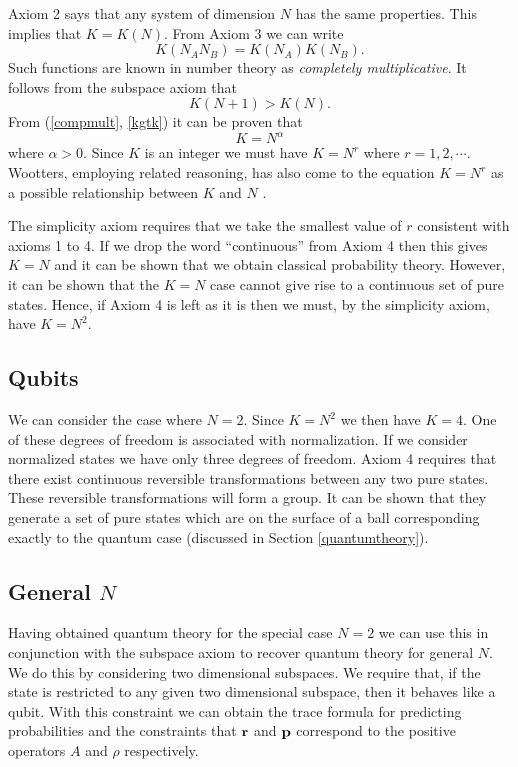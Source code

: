 \documentclass[12pt]{article}
\begin{document}
Axiom 2 says that
any system of dimension $N$ has the same properties. This implies that
$K=K(N)$.  From Axiom 3 we can write
\begin{equation}\label{compmult}
K(N_AN_B)=K(N_A)K(N_B).
\end{equation}
Such functions are known in number theory as {\it completely
multiplicative}.  It follows from the subspace axiom that
\begin{equation}\label{kgtk}
K(N+1)>K(N).
\end{equation}
From (\ref{compmult}, \ref{kgtk}) it can be proven that
\begin{equation}
K=N^{\alpha}
\end{equation}
where $\alpha>0$.  Since $K$ is an integer we must have $K=N^r$ where
$r=1,2,\cdots$. Wootters, employing related reasoning, has also
come to the equation $K=N^r$ as a possible relationship between $K$ and
$N$ \cite{wootters}.

The simplicity axiom requires that we take the smallest value of $r$
consistent with axioms 1 to 4.  If we drop the word ``continuous'' from
Axiom 4 then this gives $K=N$ and it can be shown that
we obtain classical probability
theory.  However, it can be shown that the $K=N$ case cannot give rise
to a continuous set of pure states. Hence, if Axiom 4 is left as it
is then we must, by the simplicity axiom, have $K=N^2$.

\subsection{Qubits}

We can consider the case where $N=2$.  Since $K=N^2$ we then
have $K=4$.  One of these degrees of freedom is associated with
normalization.  If we consider normalized states we have only three
degrees of freedom.  Axiom 4 requires that there exist continuous
reversible transformations between any two pure states.  These
reversible transformations will form a group. It can be shown that they
generate a set of pure states which are on the surface of a ball
corresponding exactly to the quantum case (discussed in Section
\ref{quantumtheory}).

\subsection{General $N$}

Having obtained quantum theory for the special case $N=2$ we can use
this in conjunction with the subspace axiom to recover quantum theory
for general $N$.  We do this by considering two dimensional subspaces.
We require that, if the state is restricted to any given two dimensional
subspace, then it behaves like a qubit.   With this constraint we can
obtain the trace formula for predicting probabilities and the
constraints that ${\bf r}$ and ${\bf p}$ correspond to the positive
operators $A$ and $\rho$ respectively.
\end{document}
